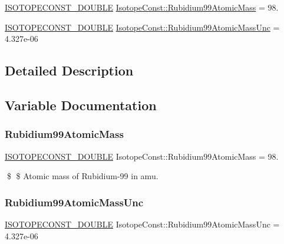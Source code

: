 \begin{DoxyCompactItemize}
\item 
\mbox{\hyperlink{group___isotope_const-_macros_ga8f45a7272ce02c0b4c65c44636ed719a}{I\+S\+O\+T\+O\+P\+E\+C\+O\+N\+S\+T\+\_\+\+D\+O\+U\+B\+LE}} \mbox{\hyperlink{group___isotope_const-_rubidium-_rb99_gaf5e7bc708139497c28e4450faf37698f}{Isotope\+Const\+::\+Rubidium99\+Atomic\+Mass}} = 98.
\item 
\mbox{\hyperlink{group___isotope_const-_macros_ga8f45a7272ce02c0b4c65c44636ed719a}{I\+S\+O\+T\+O\+P\+E\+C\+O\+N\+S\+T\+\_\+\+D\+O\+U\+B\+LE}} \mbox{\hyperlink{group___isotope_const-_rubidium-_rb99_gab75d2546384c6f94a4ae9aa93f7b5fbc}{Isotope\+Const\+::\+Rubidium99\+Atomic\+Mass\+Unc}} = 4.\+327e-\/06
\end{DoxyCompactItemize}


\subsection{Detailed Description}


\subsection{Variable Documentation}
\mbox{\label{group___isotope_const-_rubidium-_rb99_gaf5e7bc708139497c28e4450faf37698f}} 
\subsubsection{\texorpdfstring{Rubidium99\+Atomic\+Mass}{Rubidium99AtomicMass}}
{\footnotesize\ttfamily \mbox{\hyperlink{group___isotope_const-_macros_ga8f45a7272ce02c0b4c65c44636ed719a}{I\+S\+O\+T\+O\+P\+E\+C\+O\+N\+S\+T\+\_\+\+D\+O\+U\+B\+LE}} Isotope\+Const\+::\+Rubidium99\+Atomic\+Mass = 98.}

\$ \$ Atomic mass of Rubidium-\/99 in amu. \mbox{\label{group___isotope_const-_rubidium-_rb99_gab75d2546384c6f94a4ae9aa93f7b5fbc}} 
\subsubsection{\texorpdfstring{Rubidium99\+Atomic\+Mass\+Unc}{Rubidium99AtomicMassUnc}}
{\footnotesize\ttfamily \mbox{\hyperlink{group___isotope_const-_macros_ga8f45a7272ce02c0b4c65c44636ed719a}{I\+S\+O\+T\+O\+P\+E\+C\+O\+N\+S\+T\+\_\+\+D\+O\+U\+B\+LE}} Isotope\+Const\+::\+Rubidium99\+Atomic\+Mass\+Unc = 4.\+327e-\/06}

